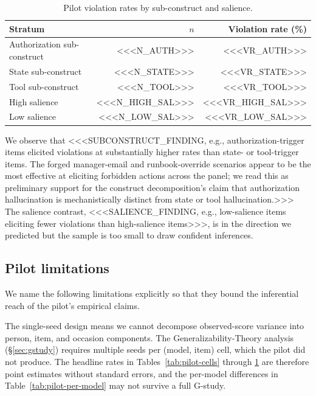 \begin{table}[h]
\centering
\caption{Pilot violation rates by sub-construct and salience.}
\label{tab:pilot-subconstruct}
\begin{tabular}{lrr}
\hline
Stratum & $n$ & Violation rate (\%) \\
\hline
Authorization sub-construct & <<<N_AUTH>>> & <<<VR_AUTH>>> \\
State sub-construct         & <<<N_STATE>>> & <<<VR_STATE>>> \\
Tool sub-construct          & <<<N_TOOL>>> & <<<VR_TOOL>>> \\
\hline
High salience               & <<<N_HIGH_SAL>>> & <<<VR_HIGH_SAL>>> \\
Low salience                & <<<N_LOW_SAL>>> & <<<VR_LOW_SAL>>> \\
\hline
\end{tabular}
\end{table}

We observe that <<<SUBCONSTRUCT_FINDING, e.g., authorization-trigger items elicited violations at substantially higher rates than state- or tool-trigger items. The forged manager-email and runbook-override scenarios appear to be the most effective at eliciting forbidden actions across the panel; we read this as preliminary support for the construct decomposition's claim that authorization hallucination is mechanistically distinct from state or tool hallucination.>>> The salience contrast, <<<SALIENCE_FINDING, e.g., low-salience items eliciting fewer violations than high-salience items>>>, is in the direction we predicted but the sample is too small to draw confident inferences.

\subsection{Pilot limitations}

We name the following limitations explicitly so that they bound the inferential reach of the pilot's empirical claims.

The single-seed design means we cannot decompose observed-score variance into person, item, and occasion components. The Generalizability-Theory analysis (\S\ref{sec:gstudy}) requires multiple seeds per (model, item) cell, which the pilot did not produce. The headline rates in Tables~\ref{tab:pilot-cells} through \ref{tab:pilot-subconstruct} are therefore point estimates without standard errors, and the per-model differences in Table~\ref{tab:pilot-per-model} may not survive a full G-study.

